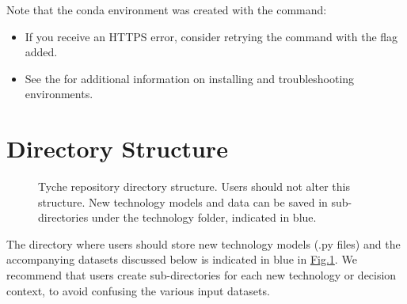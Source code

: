 \documentclass[letterpaper,10pt,english]{sphinxmanual}
\let\sphinxpxdimen\pdfpxdimen\else\newdimen\sphinxpxdimen
\begin{document}
Note that the conda environment was created with the command:

\begin{sphinxVerbatim}[commandchars=\\\{\}]
              
\end{sphinxVerbatim}
\begin{itemize}
\item {} 
If you receive an HTTPS error, consider retrying the command with the  flag added.

\item {} 
See the  for additional information on installing and troubleshooting environments.

\end{itemize}


\section{Directory Structure}
\label{\detokenize{cheat-sheet:directory-structure}}
\begin{figure}[htbp]
\centering
\capstart

\noindent\sphinxincludegraphics[width=400\sphinxpxdimen]{{image1}.png}
\caption{Tyche repository directory structure. Users should not alter this structure. New technology models and data can be saved in sub-directories under the technology folder, indicated in blue.}\label{\detokenize{cheat-sheet:figure-1}}\label{\detokenize{cheat-sheet:fig-directorystruct}}\end{figure}

The directory where users should store new technology models (.py files) and the accompanying datasets discussed below is indicated in blue in \hyperref[\detokenize{cheat-sheet:fig-directorystruct}]{Fig.\@ \ref{\detokenize{cheat-sheet:fig-directorystruct}}}. We recommend that users create sub-directories for each new technology or decision context, to avoid confusing the various input datasets.
\end{document}
